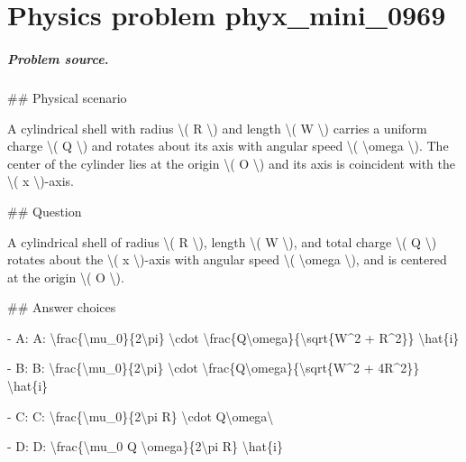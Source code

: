 
\chapter{Physics problem phyx\_mini\_0969}
\label{ch:PhyXMiniProblems_problem_phyx_mini_0969}

\paragraph{Problem source.}
\#\# Physical scenario

A cylindrical shell with radius \textbackslash{}( R \textbackslash{}) and length \textbackslash{}( W \textbackslash{}) carries a uniform charge \textbackslash{}( Q \textbackslash{}) and rotates about its axis with angular speed \textbackslash{}( \textbackslash{}omega \textbackslash{}). The center of the cylinder lies at the origin \textbackslash{}( O \textbackslash{}) and its axis is coincident with the \textbackslash{}( x \textbackslash{})-axis.

\#\# Question

A cylindrical shell of radius \textbackslash{}( R \textbackslash{}), length \textbackslash{}( W \textbackslash{}), and total charge \textbackslash{}( Q \textbackslash{}) rotates about the \textbackslash{}( x \textbackslash{})-axis with angular speed \textbackslash{}( \textbackslash{}omega \textbackslash{}), and is centered at the origin \textbackslash{}( O \textbackslash{}).

\#\# Answer choices

- A: A: \textbackslash{}frac\{\textbackslash{}mu\_0\}\{2\textbackslash{}pi\} \textbackslash{}cdot \textbackslash{}frac\{Q\textbackslash{}omega\}\{\textbackslash{}sqrt\{W\textasciicircum{}2 + R\textasciicircum{}2\}\} \textbackslash{}hat\{i\}

- B: B: \textbackslash{}frac\{\textbackslash{}mu\_0\}\{2\textbackslash{}pi\} \textbackslash{}cdot \textbackslash{}frac\{Q\textbackslash{}omega\}\{\textbackslash{}sqrt\{W\textasciicircum{}2 + 4R\textasciicircum{}2\}\} \textbackslash{}hat\{i\}

- C: C: \textbackslash{}frac\{\textbackslash{}mu\_0\}\{2\textbackslash{}pi R\} \textbackslash{}cdot Q\textbackslash{}omega\textbackslash{}

- D: D: \textbackslash{}frac\{\textbackslash{}mu\_0 Q \textbackslash{}omega\}\{2\textbackslash{}pi R\} \textbackslash{}hat\{i\}

